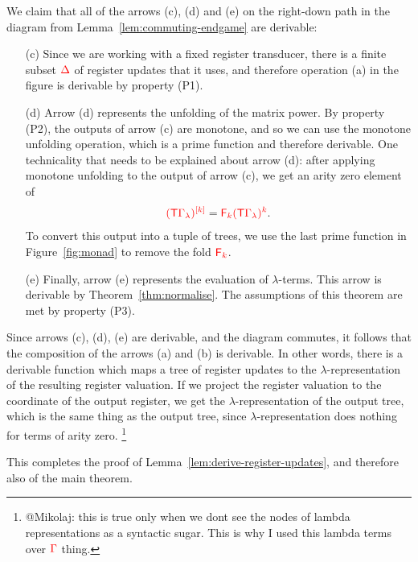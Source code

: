 We claim that all of the arrows (c), (d) and (e) on the  right-down path  in the diagram from Lemma~\ref{lem:commuting-endgame}  are derivable:
\begin{itemize}
    \item[(c)] Since we are working with a fixed register transducer, there is a finite subset $\rDelta$ of register updates that it uses, and therefore  operation (a) in the figure is derivable by property (P1).
    \item[(d)] Arrow (d) represents the unfolding of the matrix power. By property (P2), the outputs of arrow (c) are monotone, and so we can use the monotone unfolding operation, which is a  prime function and therefore derivable. One technicality that needs to be explained about arrow (d): after applying monotone unfolding to the output of arrow (c), we get an  arity zero element of 
    \begin{align*}
        \ranked{
            \mati k {(\tmonad \rGamma_\lambda)}} = \reduce  k {\powersmall{(\tmonad \rGamma_\lambda)}{k}}.
    \end{align*}
    To convert this output into a tuple of trees, we use the last prime function in Figure~\ref{fig:monad} to remove the fold $\reduce k$.
    \item[(e)] Finally, arrow (e) represents the evaluation of $\lambda$-terms. This arrow is derivable by Theorem~\ref{thm:normalise}. The assumptions of this theorem are met by property (P3).
\end{itemize}
Since arrows (c), (d), (e) are derivable, and the diagram commutes, it follows that  the composition of the arrows (a) and (b) is derivable. In other words, there is a derivable function which maps a tree of register updates to the $\lambda$-representation of the resulting register valuation. If we project the register valuation to the coordinate of the output register, we get the $\lambda$-representation of the output tree, which is the same thing as the output tree, since $\lambda$-representation does nothing for terms of arity zero. \footnote{@Mikolaj: this is true only when we dont see the nodes of lambda representations as a syntactic sugar. This is why I used this lambda terms over $\rGamma$ thing. }

This completes the proof of Lemma~\ref{lem:derive-register-updates}, and therefore also of the main theorem. 




